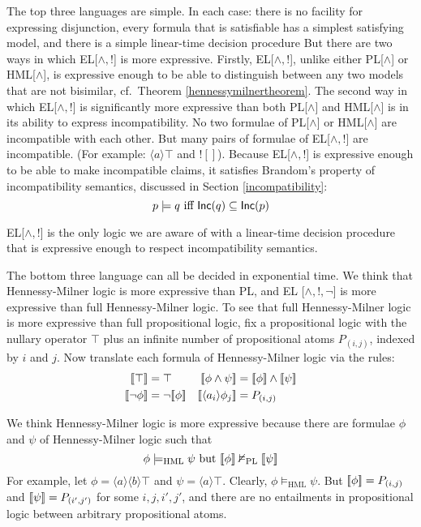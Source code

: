 \NI The top three languages are simple. In each case: there is no
facility for expressing disjunction, every formula that is satisfiable
has a simplest satisfying model, and there is a simple linear-time
decision procedure But there are two ways in which EL[$\land, !$] is
more expressive.  Firstly, EL[$\land, !$], unlike either PL[$\land$]
or HML[$\land$], is expressive enough to be able to distinguish
between any two models that are not bisimilar, cf.~Theorem
\ref{hennessymilnertheorem}.  The second way in which
EL[$\land, !$] is significantly more expressive than both PL[$\land$]
and HML[$\land$] is in its ability to express incompatibility.  No two
formulae of PL[$\land$] or HML[$\land$] are incompatible with each
other.  But many
pairs of formulae of EL[$\land, !$] are incompatible.  (For example:
$\langle a \rangle \top$ and $! []$).  Because EL[$\land, !$] is
expressive enough to be able to make incompatible claims, it satisfies
Brandom's property of incompatibility semantics, discussed in Section
\ref{incompatibility}:
\[
   p \models q \mbox{ iff } \mathsf{Inc}(q) \subseteq \mathsf{Inc}(p)
\]

\NI EL[$\land, !$] is the only logic we are aware of with a
linear-time decision procedure that is expressive enough to respect
incompatibility semantics. 

The bottom three language can all be decided in exponential time.  We
think that Hennessy-Milner logic is more expressive than PL, and EL
[$\land, !, \neg$] is more expressive than full Hennessy-Milner logic.
To see that full Hennessy-Milner logic is more expressive than full
propositional logic, fix a propositional logic with the nullary
operator $\top$ plus an infinite number of propositional atoms
$P_{(i,j)}$, indexed by $i$ and $j$.  Now translate each formula of
Hennessy-Milner logic via the rules:
\begin{align*}
  \SEMB{\top}  & =  \top  &
  \SEMB{\phi \land \psi} & =  \SEMB{\phi} \land \SEMB{\psi}  \\
  \SEMB{\neg \phi} & =  \neg \SEMB{\phi}   &
  \SEMB{\langle a_i \rangle \phi_j} & =  P_{(i,j)} 
\end{align*}

\NI We think Hennessy-Milner logic is more expressive because there
are formulae $\phi$ and $\psi$ of Hennessy-Milner logic such that
\[
\phi \models_{\text{{HML}}} \psi \mbox{ but } \lbrack\!\lbrack \phi \rbrack\!\rbrack \nvDash_{\text{PL}} \lbrack\!\lbrack \psi \rbrack\!\rbrack
\]
For example, let $\phi = \langle a \rangle \langle b \rangle \top$ and
$\psi = \langle a \rangle \top$.  Clearly, $\phi \models_{\text{HML}}
\psi$. But $\lbrack\!\lbrack \phi \rbrack\!\rbrack = P_{(i,j)}$ and $\lbrack\!\lbrack \psi \rbrack\!\rbrack = P_{(i',j')}$
for some $i,j,i',j'$, and there are no entailments in propositional
logic between arbitrary propositional atoms.

